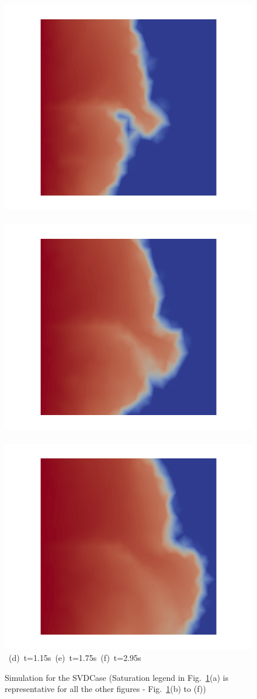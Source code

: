 \begin{landscape}
\begin{figure}[ht]
{\hbox{
      \includegraphics[width=.56\textwidth]{./Pics/SVDCase/SVDCase_Saturation_t_1dot15.png}
      \includegraphics[width=.56\textwidth]{./Pics/SVDCase/SVDCase_Saturation_t_1dot75.png} 
      \includegraphics[width=.56\textwidth]{./Pics/SVDCase/SVDCase_Saturation_t_2dot95.png}}
\vspace{0.cm}
\hbox{ \hspace{2.5cm} (d) t=1.15s \hspace{5.5cm} (e) t=1.75s   \hspace{5.5cm} (f) t=2.95s}
\vspace{0.cm}
}   
\caption{Simulation for the SVDCase (Saturation legend in Fig.~\ref{fig:SVDCase_Saturation}(a) is representative for all the other figures - \ie Fig.~\ref{fig:SVDCase_Saturation}(b) to (f))}
\label{fig:SVDCase_Saturation}
\end{figure}
\end{landscape}
\clearpage



